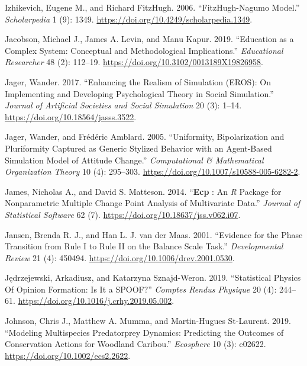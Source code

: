 \documentclass[
  a4paper,
  DIV=11,
  numbers=noendperiod,
  oneside]{scrreprt}
\newlength{\cslhangindent}
\newenvironment{CSLReferences}[2] %
 {\begin{list}{}{%
  \setlength{\itemindent}{0pt}
  \setlength{\leftmargin}{0pt}
  \setlength{\parsep}{0pt}
  \ifodd #1
   \setlength{\leftmargin}{\cslhangindent}
   \setlength{\itemindent}{-1\cslhangindent}
  \fi
  \setlength{\itemsep}{#2\baselineskip}}}
 {\end{list}}
\begin{document}
\begin{CSLReferences}{1}{0}
Izhikevich, Eugene M., and Richard FitzHugh. 2006. {``{FitzHugh-Nagumo}
Model.''} \emph{Scholarpedia} 1 (9): 1349.
\url{https://doi.org/10.4249/scholarpedia.1349}.

Jacobson, Michael J., James A. Levin, and Manu Kapur. 2019. {``Education
as a {Complex System}: {Conceptual} and {Methodological
Implications}.''} \emph{Educational Researcher} 48 (2): 112--19.
\url{https://doi.org/10.3102/0013189X19826958}.

Jager, Wander. 2017. {``Enhancing the {Realism} of {Simulation}
({EROS}): {On Implementing} and {Developing Psychological Theory} in
{Social Simulation}.''} \emph{Journal of Artificial Societies and Social
Simulation} 20 (3): 1--14. \url{https://doi.org/10.18564/jasss.3522}.

Jager, Wander, and Frédéric Amblard. 2005. {``Uniformity,
{Bipolarization} and {Pluriformity Captured} as {Generic Stylized
Behavior} with an {Agent-Based Simulation Model} of {Attitude
Change}.''} \emph{Computational \& Mathematical Organization Theory} 10
(4): 295--303. \url{https://doi.org/10.1007/s10588-005-6282-2}.

James, Nicholas A., and David S. Matteson. 2014. {``{\textbf{Ecp}} :
{An} {\emph{R}} {Package} for {Nonparametric Multiple Change Point
Analysis} of {Multivariate Data}.''} \emph{Journal of Statistical
Software} 62 (7). \url{https://doi.org/10.18637/jss.v062.i07}.

Jansen, Brenda R. J., and Han L. J. van der Maas. 2001. {``Evidence for
the Phase Transition from Rule I to Rule II on the Balance Scale
Task.''} \emph{Developmental Review} 21 (4): 450494.
\url{https://doi.org/10.1006/drev.2001.0530}.

Jędrzejewski, Arkadiusz, and Katarzyna Sznajd-Weron. 2019.
{``Statistical {Physics Of Opinion Formation}: {Is} It a {SPOOF}?''}
\emph{Comptes Rendus Physique} 20 (4): 244--61.
\url{https://doi.org/10.1016/j.crhy.2019.05.002}.

Johnson, Chris J., Matthew A. Mumma, and Martin-Hugues St-Laurent. 2019.
{``Modeling Multispecies Predator\textendash prey Dynamics: Predicting
the Outcomes of Conservation Actions for Woodland Caribou.''}
\emph{Ecosphere} 10 (3): e02622.
\url{https://doi.org/10.1002/ecs2.2622}.


\end{CSLReferences}
\end{document}
